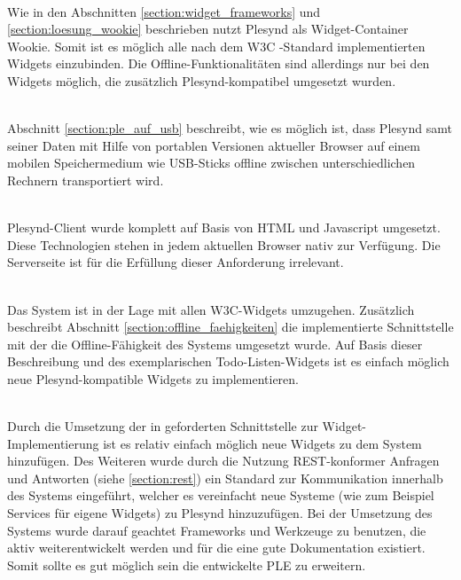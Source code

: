 \textbullet{}  \emph{\requirementWidgetStandard}\\
Wie in den Abschnitten \ref{section:widget_frameworks} und \ref{section:loesung_wookie} beschrieben nutzt Plesynd als Widget-Container Wookie. Somit ist es möglich alle nach dem W3C -Standard implementierten Widgets einzubinden. Die Offline-Funktionalitäten sind allerdings nur bei den Widgets möglich, die zusätzlich Plesynd-kompatibel umgesetzt wurden.

\textbullet{}  \emph{\requirementUsbStick}\\
Abschnitt \ref{section:ple_auf_usb} beschreibt, wie es möglich ist, dass Plesynd samt seiner Daten mit Hilfe von portablen Versionen aktueller Browser auf einem mobilen Speichermedium wie USB-Sticks offline zwischen unterschiedlichen Rechnern transportiert wird.

\textbullet{}  \emph{\requirementUsageInBrowser}\\
Plesynd-Client wurde komplett auf Basis von HTML und Javascript umgesetzt. Diese Technologien stehen in jedem aktuellen Browser nativ zur Verfügung. Die Serverseite ist für die Erfüllung dieser Anforderung irrelevant.

\textbullet{}  \emph{\requirementNewWidgetsWithApi}\\
Das System ist in der Lage mit allen W3C-Widgets umzugehen. Zusätzlich beschreibt Abschnitt \ref{section:offline_faehigkeiten} die implementierte Schnittstelle mit der die Offline-Fähigkeit des Systems umgesetzt wurde. Auf Basis dieser Beschreibung und des exemplarischen Todo-Listen-Widgets ist es einfach möglich neue Plesynd-kompatible Widgets zu implementieren.

\textbullet{}  \emph{\requirementExtensibility}\\
Durch die Umsetzung der in  geforderten Schnittstelle zur Widget-Implementierung ist es relativ einfach möglich neue Widgets zu dem System hinzufügen. Des Weiteren wurde durch die Nutzung REST-konformer Anfragen und Antworten (siehe \ref{section:rest}) ein Standard zur Kommunikation innerhalb des Systems eingeführt, welcher es vereinfacht neue Systeme (wie zum Beispiel Services für eigene Widgets) zu Plesynd hinzuzufügen. Bei der Umsetzung des Systems wurde darauf geachtet Frameworks und Werkzeuge zu benutzen, die aktiv weiterentwickelt werden und für die eine gute Dokumentation existiert. Somit sollte es gut möglich sein die entwickelte PLE zu erweitern.

